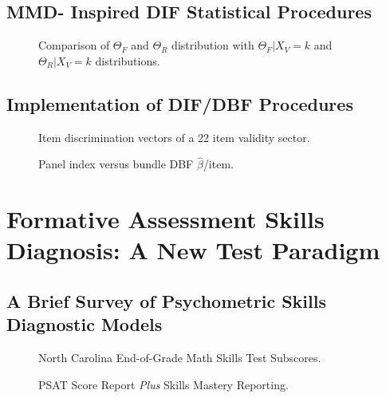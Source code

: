 \documentclass[titlepage,11pt,twoside]{article}
\begin{document}
\subsection{MMD- Inspired DIF Statistical Procedures}



\begin{figure}[h]
\caption{Comparison of $\Theta_F$ and $\Theta_R $ distribution with $\Theta_F \vert X_V = k$ and $\Theta_R \vert X_V = k$ distributions.}
\end{figure}

\subsection{Implementation of DIF/DBF Procedures}


\begin{figure}[h]
\caption{Item discrimination vectors of a 22 item validity sector.}
\end{figure}



\begin{figure}[h]
\caption{Panel index versus bundle DBF $\hat {\beta}$/item.}
\end{figure}



\section{Formative Assessment Skills Diagnosis: A New Test Paradigm}



\subsection{A Brief Survey of Psychometric Skills Diagnostic Models}



\begin{figure}[h]
\caption{North Carolina End-of-Grade Math Skills Test Subscores.}
\end{figure}



\begin{figure}[h]
\caption{PSAT Score Report \textit{Plus} Skills Mastery Reporting.}
\end{figure}
\end{document}
